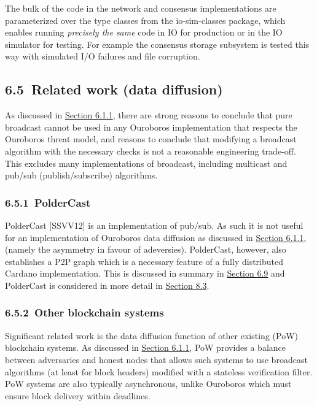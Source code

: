 \documentclass[11pt,a4paper]{article}
\begin{document}
The bulk of the code in the network and consensus implementations are
parameterized over the type classes from the io-sim-classes package,
which enables running \emph{precisely the same} code in IO for
production or in the IO simulator for testing. For example the consensus
storage subsystem is tested this way with simulated I/O failures and
file corruption.

\hypertarget{related-work-data-diffusion}{%
\subsection{​6.5​~Related work (data
diffusion)}\label{related-work-data-diffusion}}

As discussed in
\protect\hyperlink{interleaving-transmission-and-validation}{{Section
6.1.1}}, there are strong reasons to conclude that pure broadcast cannot
be used in any Ouroboros implementation that respects the Ouroboros
threat model, and reasons to conclude that modifying a broadcast
algorithm with the necessary checks is not a reasonable engineering
trade-off. This excludes many implementations of broadcast, including
multicast and pub/sub (publish/subscribe) algorithms.

\hypertarget{poldercast}{%
\subsubsection{​6.5.1​~PolderCast}\label{poldercast}}

PolderCast {[}SSVV12{]} is an implementation of pub/sub. As such it is
not useful for an implementation of Ouroboros data diffusion as
discussed in
\protect\hyperlink{interleaving-transmission-and-validation}{{Section
6.1.1}}, (namely the asymmetry in favour of adeversies). PolderCast,
however, also establishes a P2P graph which is a necessary feature of a
fully distributed Cardano implementation. This is discussed in summary
in \protect\hyperlink{related-work-decentralisation}{{Section 6.9}} and
PolderCast is considered in more detail in
\protect\hyperlink{poldercast-1}{{Section 8.3}}.

\hypertarget{other-blockchain-systems}{%
\subsubsection{​6.5.2​~Other blockchain
systems}\label{other-blockchain-systems}}

Significant related work is the data diffusion function of other
existing (PoW) blockchain systems. As discussed in
\protect\hyperlink{interleaving-transmission-and-validation}{{Section
6.1.1}}, PoW provides a balance between adversaries and honest nodes
that allows such systems to use broadcast algorithms (at least for block
headers) modified with a stateless verification filter. PoW systems are
also typically asynchronous, unlike Ouroboros which must ensure block
delivery within deadlines.
\end{document}
